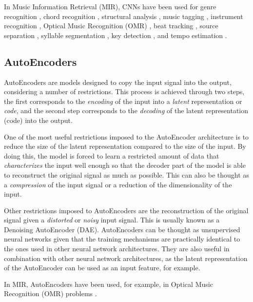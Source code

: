In Music Information Retrieval (MIR), CNNs have been used for genre recognition \cite{dieleman_audio-based_2011}, chord recognition \cite{humphrey_rethinking_2012}, structural analysis \cite{ullrich_boundary_2014, grill_music_2015}, music tagging \cite{choi_automatic_2016}, instrument recognition \cite{lostanlen_deep_2016}, Optical Music Recognition (OMR) \cite{calvo-zaragoza_end--end_2017, pacha_optical_2018}, beat tracking \cite{gkiokas_convolutional_2017}, source separation \cite{miron_monaural_2017}, syllable segmentation \cite{pons_score-informed_2017}, key detection \cite{korzeniowski_genre-agnostic_2018}, and tempo estimation \cite{schreiber_single-step_2018, schreiber_musical_2019}.

\subsection{AutoEncoders}
AutoEncoders are models designed to copy the input signal into the output, considering a number of restrictions. This process is achieved through two steps, the first corresponds to the \emph{encoding} of the input into a \emph{latent} representation or \emph{code}, and the second step corresponds to the \emph{decoding} of the latent representation (code) into the output.

One of the most useful restrictions imposed to the AutoEncoder architecture is to reduce the size of the latent representation compared to the size of the input. By doing this, the model is forced to learn a restricted amount of data that \emph{characterizes} the input well enough so that the decoder part of the model is able to reconstruct the original signal as much as possible. This can also be thought as a \emph{compression} of the input signal or a reduction of the dimensionality of the input.

Other restrictions imposed to AutoEncoders are the reconstruction of the original signal given a \emph{distorted} or \emph{noisy} input signal. This is usually known as a Denoising AutoEncoder (DAE). AutoEncoders can be thought as unsupervised neural networks given that the training mechanisms are practically identical to the ones used in other neural network architectures. They are also useful in combination with other neural network architectures, as the latent representation of the AutoEncoder can be used as an input feature, for example.

In MIR, AutoEncoders have been used, for example, in Optical Music Recognition (OMR) problems \cite{castellanos_document_2018}.

